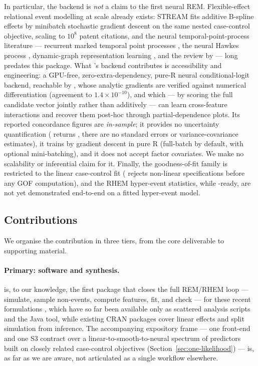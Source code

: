 In particular, the  backend is \emph{not} a claim to the first neural
REM. Flexible-effect relational event modelling at scale already exists:
STREAM \citep{filippimazzola2024} fits additive B-spline effects by minibatch
stochastic gradient descent on the same nested case-control objective, scaling
to $10^{8}$ patent citations, and the neural temporal-point-process literature
--- recurrent marked temporal point processes \citep{du2016}, the neural
Hawkes process \citep{mei2017}, dynamic-graph representation learning
\citep{trivedi2019}, and the review by \citet{shchur2021} --- long predates
this package. What
's  backend contributes is accessibility and engineering: a
GPU-free, zero-extra-dependency, pure-R neural conditional-logit backend,
reachable by , whose analytic gradients are
verified against numerical differentiation (agreement to
$1.4\times10^{-10}$), and which --- by scoring the full candidate vector
jointly rather than additively --- can learn cross-feature interactions and
recover them post-hoc through partial-dependence plots. Its reported
concordance figures are \emph{in-sample}; it provides no uncertainty
quantification ( returns , there are no standard errors
or variance-covariance estimates), it trains by gradient descent in pure R
(full-batch by default, with optional mini-batching), and it does not accept
factor covariates. We make no scalability or inferential claim
for it. Finally, the goodness-of-fit family is restricted to the linear
case-control fit ( rejects non-linear specifications before any GOF
computation), and the RHEM hyper-event statistics, while -ready, are
not yet demonstrated end-to-end on a fitted hyper-event model.

\subsection{Contributions}
\label{sec:contributions}

We organise the contribution in three tiers, from the core deliverable to
supporting material.

\paragraph{Primary: software and synthesis.}
 is, to our knowledge, the first  package that closes
the full REM/RHEM loop --- simulate, sample non-events, compute features,
fit, and check --- for these recent formulations
\citep{juozaitiene2024, lembo2025, boschi2025gof, boschi2025rhem}, which
have so far been available only as scattered analysis scripts and the Java
 tool, while existing CRAN packages cover linear effects and
split simulation from inference. The accompanying expository frame --- one
front-end and one S3 contract over a linear-to-smooth-to-neural spectrum of
predictors built on closely related case-control objectives
(Section~\ref{sec:one-likelihood}) --- is, as far as we are aware, not
articulated as a single workflow elsewhere.

